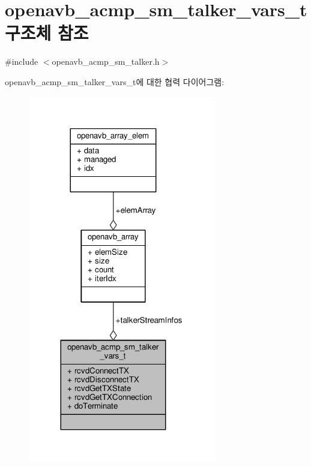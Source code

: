\hypertarget{structopenavb__acmp__sm__talker__vars__t}{}\section{openavb\+\_\+acmp\+\_\+sm\+\_\+talker\+\_\+vars\+\_\+t 구조체 참조}
\label{structopenavb__acmp__sm__talker__vars__t}


{\ttfamily \#include $<$openavb\+\_\+acmp\+\_\+sm\+\_\+talker.\+h$>$}



openavb\+\_\+acmp\+\_\+sm\+\_\+talker\+\_\+vars\+\_\+t에 대한 협력 다이어그램\+:
\nopagebreak
\begin{figure}[H]
\begin{center}
\leavevmode
\includegraphics[width=233pt]{structopenavb__acmp__sm__talker__vars__t__coll__graph}
\end{center}
\end{figure}
